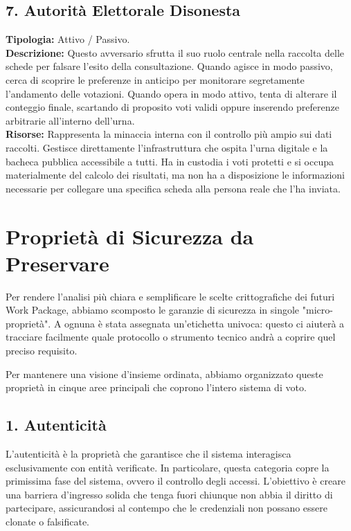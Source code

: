 \subsection*{7. Autorità Elettorale Disonesta}
\textbf{Tipologia:} Attivo / Passivo. \\
\textbf{Descrizione:} Questo avversario sfrutta il suo ruolo centrale nella raccolta delle schede per falsare l'esito della consultazione. Quando agisce in modo passivo, cerca di scoprire le preferenze in anticipo per monitorare segretamente l'andamento delle votazioni. Quando opera in modo attivo, tenta di alterare il conteggio finale, scartando di proposito voti validi oppure inserendo preferenze arbitrarie all'interno dell'urna. \\
\textbf{Risorse:} Rappresenta la minaccia interna con il controllo più ampio sui dati raccolti. Gestisce direttamente l'infrastruttura che ospita l'urna digitale e la bacheca pubblica accessibile a tutti. Ha in custodia i voti protetti e si occupa materialmente del calcolo dei risultati, ma non ha a disposizione le informazioni necessarie per collegare una specifica scheda alla persona reale che l'ha inviata.


\section{Proprietà di Sicurezza da Preservare}
\label{sec:1.6_proprieta_sicurezza}

Per rendere l'analisi più chiara e semplificare le scelte crittografiche dei futuri Work Package, abbiamo scomposto le garanzie di sicurezza in singole "micro-proprietà". A ognuna è stata assegnata un'etichetta univoca: questo ci aiuterà a tracciare facilmente quale protocollo o strumento tecnico andrà a coprire quel preciso requisito. 

Per mantenere una visione d'insieme ordinata, abbiamo organizzato queste proprietà in cinque aree principali che coprono l'intero sistema di voto.

\subsection*{1. Autenticità}
L'autenticità è la proprietà che garantisce che il sistema interagisca esclusivamente con entità verificate. In particolare, questa categoria copre la primissima fase del sistema, ovvero il controllo degli accessi. L'obiettivo è creare una barriera d'ingresso solida che tenga fuori chiunque non abbia il diritto di partecipare, assicurandosi al contempo che le credenziali non possano essere clonate o falsificate.

